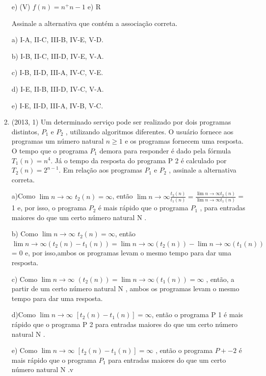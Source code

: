\documentclass{article}
\begin{document}
\begin{enumerate}
e) (V) $f (n) = n^ + n -1$ \hspace{40}  e) R
 
 
Assinale a alternativa que contém a associação correta.

a) I-A, II-C, III-B, IV-E, V-D.

b) I-B, II-C, III-D, IV-E, V-A.

c) I-B, II-D, III-A, IV-C, V-E.

d) I-E, II-B, III-D, IV-C, V-A.

e) I-E, II-D, III-A, IV-B, V-C.\newline



\item(2013, 1) Um determinado serviço pode ser realizado por dois programas distintos, $P_1$ e $P_2$ , utilizando algoritmos diferentes. O usuário fornece aos programas um número natural $n  \geq 1$ e os programas fornecem uma resposta. O tempo que o programa $P_1$ demora para responder é dado pela fórmula $T_1 (n) = n^4$. Já o tempo da resposta do programa P 2 é calculado por $T_2 (n) = 2^{n-1}$. Em relação aos programas $P_1$ e $P_2$ , assinale a alternativa correta.

a)Como $\lim{n \to \infty}$ $t_2 (n) = \infty$, então $\lim{n \to \infty} \frac{t_2(n)}{t_1(n)} = \frac{\lim{n \to \infty} t_2(n)}{\lim{n \to \infty}t_1(n)}$ = 1 e, por isso, o programa $P_2$ é mais rápido que o programa $P_1$ , para entradas maiores do que um certo número natural N .

b) Como $\lim{n \to \infty}$ $t_2 (n) = \infty$, então $\lim{n \to \infty} (t_2(n) - t_1(n)) =\lim{n \to \infty} (t_2(n)) - \lim{n \to \infty}(t_1(n))$ = 0 e, por isso,ambos os programas levam o mesmo tempo para dar uma resposta.

c) Como $\lim{n \to \infty}$ $(t_2(n)) = \lim{n \to \infty}(t_1(n)) = \infty$ , então, a partir de um certo número natural N , ambos os programas levam o mesmo tempo para dar uma resposta.

d)Como $\lim{n \to \infty}$ $[t_2(n) - t_1(n)] = \infty$, então o programa P 1 é mais rápido que o programa P 2 para entradas maiores do que um certo número natural N .

e) Como $\lim{n \to \infty}$ $[t_2(n) - t_1(n)] = \infty$ , então o programa $P+-2$ é mais rápido que o programa $P_1$ para entradas maiores do que um certo número natural N .v\newline







\end{enumerate}
\end{document}
